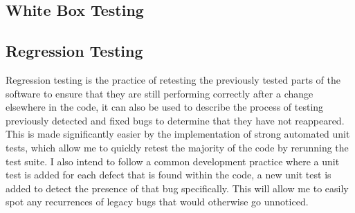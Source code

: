 \subsection{White Box Testing}


\subsection{Regression Testing}
Regression testing is the practice of retesting the previously tested parts of the software to ensure that they are still performing correctly after a change elsewhere in the code, it can also be used to describe the process of testing previously detected and fixed bugs to determine that they have not reappeared.
This is made significantly easier by the implementation of strong automated unit tests, which allow me to quickly retest the majority of the code by rerunning the test suite.
I also intend to follow a common development practice where a unit test is added for each defect that is found within the code, a new unit test is added to detect the presence of that bug specifically. 
This will allow me to easily spot any recurrences of legacy bugs that would otherwise go unnoticed.
